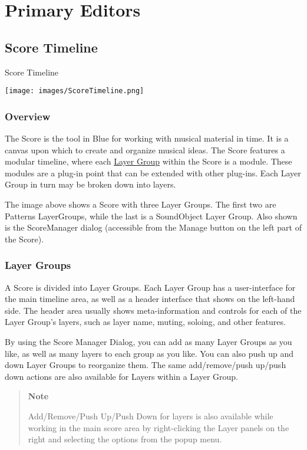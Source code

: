 \section{Primary Editors}\label{primaryEditors}

\subsection{Score Timeline}\label{scoreTimeline}

Score Timeline

\texttt{[image: images/ScoreTimeline.png]}

\subsubsection{Overview}

The Score is the tool in Blue for working with musical material in time.
It is a canvas upon which to create and organize musical ideas. The
Score features a modular timeline, where each
\protect\hyperlink{layerGroups}{Layer Group} within the Score is a
module. These modules are a plug-in point that can be extended with
other plug-ins. Each Layer Group in turn may be broken down into layers.

The image above shows a Score with three Layer Groups. The first two are
Patterns LayerGroups, while the last is a SoundObject Layer Group. Also
shown is the ScoreManager dialog (accessible from the Manage button on
the left part of the Score).

\hypertarget{layerGroups}{\subsubsection{Layer Groups}\label{layerGroups}}

A Score is divided into Layer Groups. Each Layer Group has a
user-interface for the main timeline area, as well as a header interface
that shows on the left-hand side. The header area usually shows
meta-information and controls for each of the Layer Group's layers, such
as layer name, muting, soloing, and other features.

By using the Score Manager Dialog, you can add as many Layer Groups as
you like, as well as many layers to each group as you like. You can also
push up and down Layer Groups to reorganize them. The same
add/remove/push up/push down actions are also available for Layers
within a Layer Group.

\begin{quote}
\textbf{Note}

Add/Remove/Push Up/Push Down for layers is also available while working
in the main score area by right-clicking the Layer panels on the right
and selecting the options from the popup menu.
\end{quote}

